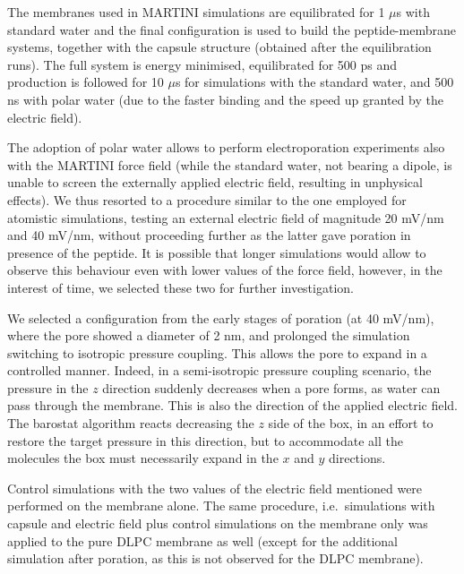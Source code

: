 The membranes used in MARTINI simulations are equilibrated for 1 $\mu$s with standard water and the final configuration is used to build the peptide-membrane systems, together with the capsule structure (obtained after the equilibration runs). The full system is energy minimised, equilibrated for 500 ps and production is followed for 10 $\mu$s for simulations with the standard water, and 500 ns with polar water (due to the faster binding and the speed up granted by the electric field).

The adoption of polar water allows to perform electroporation experiments also with the MARTINI force field (while the standard water, not bearing a dipole, is unable to screen the externally applied electric field, resulting in unphysical effects).
%
We thus resorted to a procedure similar to the one employed for atomistic simulations, testing an external electric field of magnitude 20 mV/nm and 40 mV/nm, without proceeding further as the latter gave poration in presence of the peptide.
%
It is possible that longer simulations would allow to observe this behaviour even with lower values of the force field, however, in the interest of time, we selected these two for further investigation.

We selected a configuration from the early stages of poration (at 40 mV/nm), where the pore showed a diameter of 2 nm, and prolonged the simulation switching to isotropic pressure coupling. This allows the pore to expand in a controlled manner. Indeed, in a semi-isotropic pressure coupling scenario, the pressure in the $z$ direction suddenly decreases when a pore forms, as water can pass through the membrane. This is also the direction of the applied electric field. The barostat algorithm reacts decreasing the $z$ side of the box, in an effort to restore the target pressure in this direction, but to accommodate all the molecules the box must necessarily expand in the $x$ and $y$ directions.

Control simulations with the two values of the electric field mentioned were performed on the membrane alone. The same procedure, i.e.\ simulations with capsule and electric field plus control simulations on the membrane only was applied to the pure DLPC membrane as well (except for the additional simulation after poration, as this is not observed for the DLPC membrane).


